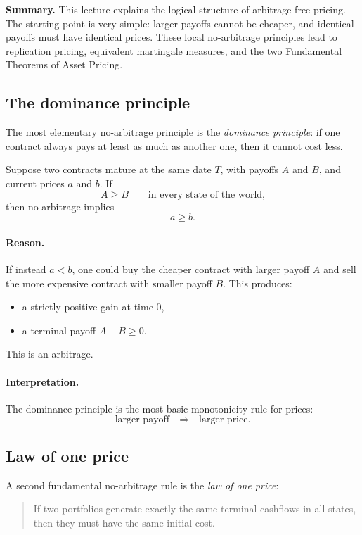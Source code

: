 \documentclass[11pt]{article}
\newcommand{\1}{\mathbf{1}}
\theoremstyle{plain}
\theoremstyle{definition}
\theoremstyle{remark}
\newcommand{\lecturesummary}[1]{%
\begin{center}
\begin{minipage}{0.95\linewidth}
\small\textbf{Summary.} #1
\end{minipage}
\end{center}
\vspace{0.5em}
}
\begin{document}
\lecturesummary{
This lecture explains the logical structure of arbitrage-free pricing.
The starting point is very simple: larger payoffs cannot be cheaper, and identical payoffs must have identical prices.
These local no-arbitrage principles lead to replication pricing, equivalent martingale measures, and the two Fundamental Theorems of Asset Pricing.
}

\subsection{The dominance principle}

The most elementary no-arbitrage principle is the \emph{dominance principle}:
if one contract always pays at least as much as another one, then it cannot cost less.

Suppose two contracts mature at the same date \(T\), with payoffs \(A\) and \(B\), and current prices \(a\) and \(b\).
If
\[
A\ge B
\qquad\text{in every state of the world,}
\]
then no-arbitrage implies
\[
\boxed{\ a\ge b.\ }
\]

\paragraph{Reason.}
If instead \(a<b\), one could buy the cheaper contract with larger payoff \(A\) and sell the more expensive contract with smaller payoff \(B\).
This produces:
\begin{itemize}
    \item a strictly positive gain at time \(0\),
    \item a terminal payoff \(A-B\ge 0\).
\end{itemize}
This is an arbitrage.

\paragraph{Interpretation.}
The dominance principle is the most basic monotonicity rule for prices:
\[
\text{larger payoff} \quad\Longrightarrow\quad \text{larger price.}
\]

\subsection{Law of one price}

A second fundamental no-arbitrage rule is the \emph{law of one price}:

\begin{quote}
If two portfolios generate exactly the same terminal cashflows in all states, then they must have the same initial cost.
\end{quote}
\end{document}
